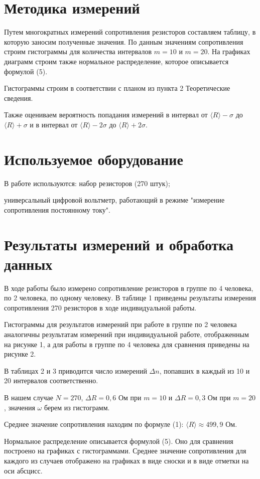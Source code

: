 \documentclass[a4paper,12pt]{article}
\begin{document}
	\section{Методика измерений}
 Путем многократных измерений сопротивления резисторов составляем таблицу, в которую заносим полученные значения. По данным значениям сопротивления строим гистограммы для количества интервалов $m = 10$ и $m = 20$. На графиках диаграмм строим также нормальное распределение, которое описывается формулой (5).

 Гистограммы строим в соответствии с планом из пункта 2 Теоретические сведения.

 Также оцениваем вероятность попадания измерений в интервал от $\langle R \rangle - \sigma$ до $\langle R \rangle + \sigma$ и в интервал от $\langle R \rangle - 2\sigma$ до $\langle R \rangle + 2\sigma$.

 
	 \setlength{\parindent}{1cm} 
	\section{Используемое оборудование}
В работе используются: набор резисторов (270 штук); 

универсальный цифровой вольтметр, работающий в режиме "измерение сопротивления постоянному току".
        \section{Результаты измерений и обработка данных}
        В ходе работы было измерено сопротивление резисторов в группе по 4 человека, по 2 человека, по одному человеку. В таблице 1 приведены результаты измерения сопротивления 270 резисторов в ходе индивидуальной работы. 

        Гистограммы для результатов измерений при работе в группе по 2 человека аналогичны результатам измерений при индивидуальной работе, отображенным на рисунке 1, а для работы в группе по 4 человека для сравнения приведены на рисунке 2.

        В таблицах 2 и 3 приводится число измерений $\Delta n$, попавших в каждый из 10 и 20 интервалов соответственно.

        В нашем случае $N = 270$,  $ \Delta R = 0,6$ Ом при $m = 10$ и $\Delta R = 0,3$ Ом при $m = 20$, значения $\omega$ берем из гистограмм.

        Среднее значение сопротивления находим по формуле (1): $\langle R\rangle \approx 499,9 $ Ом.
        
        Нормальное распределение описывается формулой (5). 
        Оно для сравнения построено на графиках с гистограммами. Среднее значение сопротивления для каждого из случаев отображено на графиках в виде сноски и в виде отметки на оси абсцисс.
\end{document}
